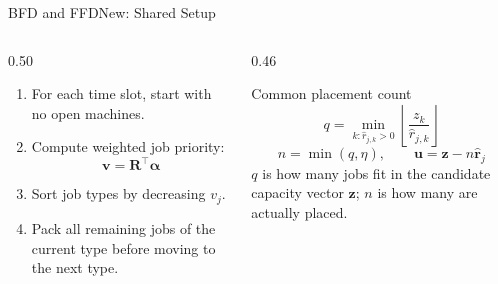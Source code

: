 \documentclass[aspectratio=169,10pt]{beamer}
\newcommand{\R}{\mathbf{R}}
\begin{document}
\begin{frame}{BFD and FFDNew: Shared Setup}
  \begin{columns}[T,totalwidth=\textwidth]
    \begin{column}{0.50\textwidth}
      \begin{enumerate}
        \item For each time slot, start with no open machines.
        \item Compute weighted job priority:
        \[
          \mathbf{v}=\R^\top\boldsymbol{\alpha}
        \]
        \item Sort job types by decreasing $v_j$.
        \item Pack all remaining jobs of the current type before moving to the next type.
      \end{enumerate}
    \end{column}
    \begin{column}{0.46\textwidth}
      \begin{block}{Common placement count}
        \[
          q=\min_{k:\hat{r}_{j,k}>0}
            \left\lfloor\frac{z_k}{\hat{r}_{j,k}}\right\rfloor
        \]
        \[
          n=\min(q,\eta),\qquad
          \mathbf{u}=\mathbf{z}-n\hat{\mathbf{r}}_j
        \]
        $q$ is how many jobs fit in the candidate capacity vector $\mathbf{z}$; $n$ is how many are actually placed.
      \end{block}
    \end{column}
  \end{columns}
\end{frame}
\end{document}
